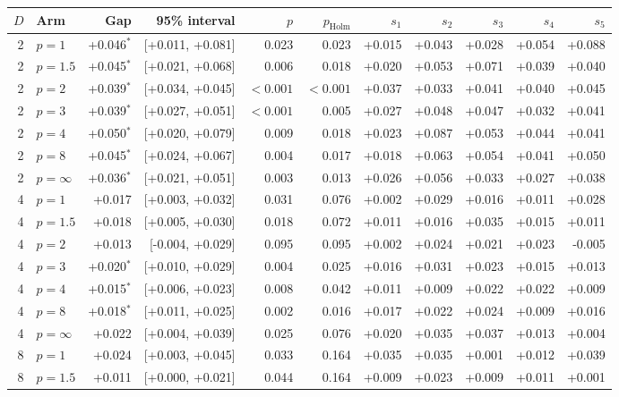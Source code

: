 \begin{longtable}{rlrrrrrrrrr}
\toprule
$D$ & Arm & Gap & 95\% interval & $p$ & $p_{\text{Holm}}$ & $s_1$ & $s_2$ & $s_3$ & $s_4$ & $s_5$ \\
\midrule
\endhead
2 & $p=1$ & +0.046$^{*}$ & [+0.011, +0.081] & 0.023 & 0.023 & +0.015 & +0.043 & +0.028 & +0.054 & +0.088 \\
2 & $p=1.5$ & +0.045$^{*}$ & [+0.021, +0.068] & 0.006 & 0.018 & +0.020 & +0.053 & +0.071 & +0.039 & +0.040 \\
2 & $p=2$ & +0.039$^{*}$ & [+0.034, +0.045] & $<0.001$ & $<0.001$ & +0.037 & +0.033 & +0.041 & +0.040 & +0.045 \\
2 & $p=3$ & +0.039$^{*}$ & [+0.027, +0.051] & $<0.001$ & 0.005 & +0.027 & +0.048 & +0.047 & +0.032 & +0.041 \\
2 & $p=4$ & +0.050$^{*}$ & [+0.020, +0.079] & 0.009 & 0.018 & +0.023 & +0.087 & +0.053 & +0.044 & +0.041 \\
2 & $p=8$ & +0.045$^{*}$ & [+0.024, +0.067] & 0.004 & 0.017 & +0.018 & +0.063 & +0.054 & +0.041 & +0.050 \\
2 & $p=\infty$ & +0.036$^{*}$ & [+0.021, +0.051] & 0.003 & 0.013 & +0.026 & +0.056 & +0.033 & +0.027 & +0.038 \\
\midrule
4 & $p=1$ & +0.017 & [+0.003, +0.032] & 0.031 & 0.076 & +0.002 & +0.029 & +0.016 & +0.011 & +0.028 \\
4 & $p=1.5$ & +0.018 & [+0.005, +0.030] & 0.018 & 0.072 & +0.011 & +0.016 & +0.035 & +0.015 & +0.011 \\
4 & $p=2$ & +0.013 & [-0.004, +0.029] & 0.095 & 0.095 & +0.002 & +0.024 & +0.021 & +0.023 & -0.005 \\
4 & $p=3$ & +0.020$^{*}$ & [+0.010, +0.029] & 0.004 & 0.025 & +0.016 & +0.031 & +0.023 & +0.015 & +0.013 \\
4 & $p=4$ & +0.015$^{*}$ & [+0.006, +0.023] & 0.008 & 0.042 & +0.011 & +0.009 & +0.022 & +0.022 & +0.009 \\
4 & $p=8$ & +0.018$^{*}$ & [+0.011, +0.025] & 0.002 & 0.016 & +0.017 & +0.022 & +0.024 & +0.009 & +0.016 \\
4 & $p=\infty$ & +0.022 & [+0.004, +0.039] & 0.025 & 0.076 & +0.020 & +0.035 & +0.037 & +0.013 & +0.004 \\
\midrule
8 & $p=1$ & +0.024 & [+0.003, +0.045] & 0.033 & 0.164 & +0.035 & +0.035 & +0.001 & +0.012 & +0.039 \\
8 & $p=1.5$ & +0.011 & [+0.000, +0.021] & 0.044 & 0.164 & +0.009 & +0.023 & +0.009 & +0.011 & +0.001 \\

\end{longtable}
